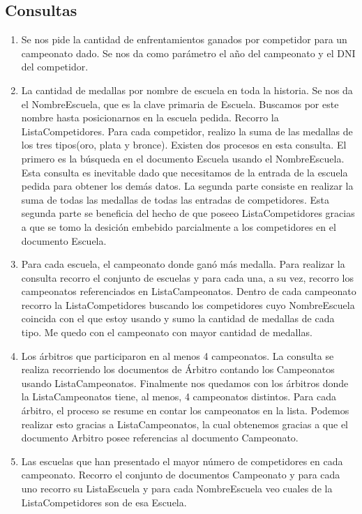 \subsection{Consultas}
\begin{enumerate}
\item Se nos pide la cantidad de enfrentamientos ganados por competidor para un campeonato dado. Se nos da como parámetro
el año del campeonato y el DNI del competidor.

\item La cantidad de medallas por nombre de escuela en toda la historia. Se nos da el NombreEscuela, que es la clave primaria de Escuela.
Buscamos por este nombre hasta posicionarnos en la escuela pedida. Recorro la ListaCompetidores. Para cada competidor, realizo la suma de las medallas de los
tres tipos(oro, plata y bronce). Existen dos procesos en esta consulta. El primero es la búsqueda en el documento Escuela
usando el NombreEscuela. Esta consulta es inevitable dado que necesitamos de la entrada de la escuela pedida para obtener
los demás datos. La segunda parte consiste en realizar la suma de todas las medallas de todas las entradas de
competidores. Esta segunda parte se beneficia del hecho de que poseeo ListaCompetidores gracias a que se tomo la desición
embebido parcialmente a los competidores en el documento Escuela.

\item Para cada escuela, el campeonato donde ganó más medalla. Para realizar la consulta recorro el conjunto de
escuelas y para cada una, a su vez, recorro los campeonatos referenciados en ListaCampeonatos. Dentro de cada
campeonato recorro la ListaCompetidores buscando los competidores cuyo NombreEscuela coincida con el que estoy usando y
sumo la cantidad de medallas de cada tipo. Me quedo con el campeonato con mayor cantidad de medallas.

\item Los árbitros que participaron en al menos 4 campeonatos. La consulta se realiza recorriendo los documentos
de Árbitro contando los Campeonatos usando ListaCampeonatos. Finalmente nos quedamos con los árbitros donde la ListaCampeonatos
tiene, al menos, 4 campeonatos distintos. Para cada árbitro, el proceso se resume en contar los campeonatos en la lista.
Podemos realizar esto gracias a ListaCampeonatos, la cual obtenemos gracias a que el documento Arbitro posee referencias
al documento Campeonato.

\item Las escuelas que han presentado el mayor número de competidores en cada campeonato. Recorro el conjunto de documentos
Campeonato y para cada uno recorro su ListaEscuela y para cada NombreEscuela veo cuales de la ListaCompetidores son de esa
Escuela.


\end{enumerate}
